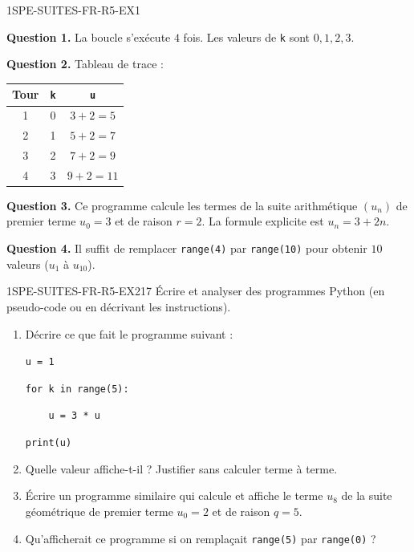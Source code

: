 \begin{corrige}{1SPE-SUITES-FR-R5-EX1}


\textbf{Question 1.} La boucle s'exécute $4$ fois. Les valeurs de \verb|k| sont $0, 1, 2, 3$.

\textbf{Question 2.} Tableau de trace :

\begin{center}
\begin{tabular}{|c|c|c|}
\hline
Tour & \verb|k| & \verb|u| \\
\hline
1 & 0 & $3 + 2 = 5$ \\
2 & 1 & $5 + 2 = 7$ \\
3 & 2 & $7 + 2 = 9$ \\
4 & 3 & $9 + 2 = 11$ \\
\hline
\end{tabular}
\end{center}


\textbf{Question 3.} Ce programme calcule les termes de la suite arithmétique $(u_n)$ de premier terme $u_0 = 3$ et de raison $r = 2$. La formule explicite est $u_n = 3 + 2n$.

\textbf{Question 4.} Il suffit de remplacer \verb|range(4)| par \verb|range(10)| pour obtenir $10$ valeurs ($u_1$ à $u_{10}$).

\end{corrige}


\begin{exercice}{1SPE-SUITES-FR-R5-EX2}{1}{7}
Écrire et analyser des programmes Python (en pseudo-code ou en décrivant les instructions).

\begin{enumerate}
  \item Décrire ce que fait le programme suivant :

\medskip
\verb|u = 1|

\verb|for k in range(5):|

\verb|    u = 3 * u|

\verb|print(u)|

  \item Quelle valeur affiche-t-il ? Justifier sans calculer terme à terme.
  \item Écrire un programme similaire qui calcule et affiche le terme $u_8$ de la suite géométrique de premier terme $u_0 = 2$ et de raison $q = 5$.
  \item Qu'afficherait ce programme si on remplaçait \texttt{range(5)} par \texttt{range(0)} ?
\end{enumerate}
\end{exercice}

